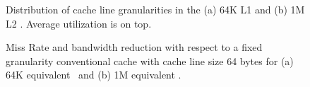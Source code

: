 {\begin{figure}[!h]
  \caption[Distribution of cache block sizes]{Distribution of cache line granularities in the (a) 64K L1 and (b) 1M L2 \AC{}. Average utilization is on top.}
  \label{fig:StackBar_PredictorSize}
\end{figure}

\clearpage

\begin{figure}[!h]
  \centering

  \caption[Miss Rate and Bandwidth Improvement]{Miss Rate and bandwidth reduction with respect to a fixed granularity conventional cache with cache line size 64 bytes for (a) 64K equivalent \AC\ and (b) 1M equivalent \AC{}.}
  \label{fig:miss_bw_reduction}
\end{figure}

}
